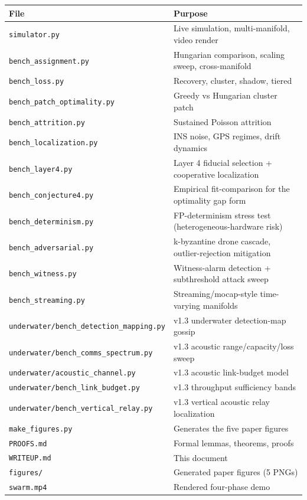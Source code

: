 {\def\LTcaptype{none} %
\begin{longtable}[]{@{}
  >{\raggedright\arraybackslash}p{}
  >{\raggedright\arraybackslash}p{}@{}}
\toprule\noalign{}
\begin{minipage}[b]{\linewidth}\raggedright
File
\end{minipage} & \begin{minipage}[b]{\linewidth}\raggedright
Purpose
\end{minipage} \\
\midrule\noalign{}
\endhead
\bottomrule\noalign{}
\endlastfoot
\texttt{simulator.py} & Live simulation, multi-manifold, video render \\
\texttt{bench\_assignment.py} & Hungarian comparison, scaling sweep,
cross-manifold \\
\texttt{bench\_loss.py} & Recovery, cluster, shadow, tiered \\
\texttt{bench\_patch\_optimality.py} & Greedy vs Hungarian cluster
patch \\
\texttt{bench\_attrition.py} & Sustained Poisson attrition \\
\texttt{bench\_localization.py} & INS noise, GPS regimes, drift
dynamics \\
\texttt{bench\_layer4.py} & Layer 4 fiducial selection + cooperative
localization \\
\texttt{bench\_conjecture4.py} & Empirical fit-comparison for the
optimality gap form \\
\texttt{bench\_determinism.py} & FP-determinism stress test
(heterogeneous-hardware risk) \\
\texttt{bench\_adversarial.py} & k-byzantine drone cascade,
outlier-rejection mitigation \\
\texttt{bench\_witness.py} & Witness-alarm detection + subthreshold
attack sweep \\
\texttt{bench\_streaming.py} & Streaming/mocap-style time-varying
manifolds \\
\texttt{underwater/bench\_detection\_mapping.py} & v1.3 underwater
detection-map gossip \\
\texttt{underwater/bench\_comms\_spectrum.py} & v1.3 acoustic
range/capacity/loss sweep \\
\texttt{underwater/acoustic\_channel.py} & v1.3 acoustic link-budget
model \\
\texttt{underwater/bench\_link\_budget.py} & v1.3 throughput sufficiency
bands \\
\texttt{underwater/bench\_vertical\_relay.py} & v1.3 vertical acoustic
relay localization \\
\texttt{make\_figures.py} & Generates the five paper figures \\
\texttt{PROOFS.md} & Formal lemmas, theorems, proofs \\
\texttt{WRITEUP.md} & This document \\
\texttt{figures/} & Generated paper figures (5 PNGs) \\
\texttt{swarm.mp4} & Rendered four-phase demo \\
\end{longtable}
}
